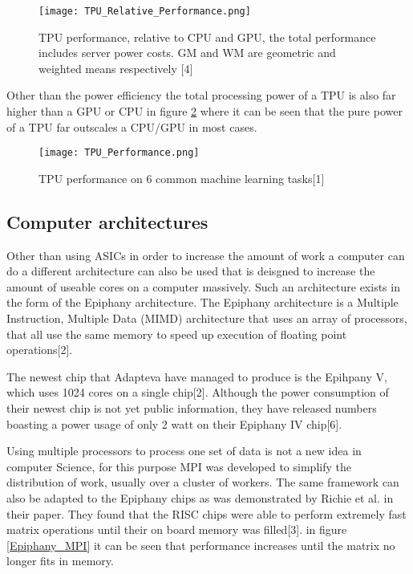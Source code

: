 \begin{figure}
  \texttt{[image: TPU\_Relative\_Performance.png]}
  \caption{TPU performance, relative to CPU and GPU, the total performance includes server power costs. GM and WM are geometric and weighted means respectively [4]}
  \label{TPU_Relative_Performance}
\end{figure}

Other than the power efficiency the total processing power of a TPU is also far higher
than a GPU or CPU in figure \ref{TPU_Performance} where it can be seen that the pure
power of a TPU far outscales a CPU/GPU in most cases.

\begin{figure}
  \texttt{[image: TPU\_Performance.png]}
  \caption{TPU performance on 6 common machine learning tasks[1]}
  \label{TPU_Performance}
\end{figure}


\subsection{Computer architectures}
Other than using ASICs in order to increase the amount of work a computer can do
a different architecture can also be used that is deisgned to increase the amount
of useable cores on a computer massively. Such an architecture exists in the form
of the Epiphany architecture. The Epiphany architecture is a Multiple Instruction,
Multiple Data (MIMD) architecture that uses an array of processors, that all use the
same memory to speed up execution of floating point operations[2].

The newest chip that Adapteva have managed to produce is the Epihpany V, which uses
1024 cores on a single chip[2]. Although the power consumption of their newest chip
is not yet public information, they have released numbers boasting a power usage of
only 2 watt on their Epiphany IV chip[6].

Using multiple processors to process one set of data is not a new idea in computer
Science, for this purpose MPI was developed to simplify the distribution of work,
usually over a cluster of workers. The same framework can also be adapted to the
Epiphany chips as was demonstrated by Richie et al. in their paper. They found that
the RISC chips were able to perform extremely fast matrix operations until their on board
memory was filled[3]. in figure \ref{Epiphany_MPI} it can be seen that performance increases
until the matrix no longer fits in memory.


